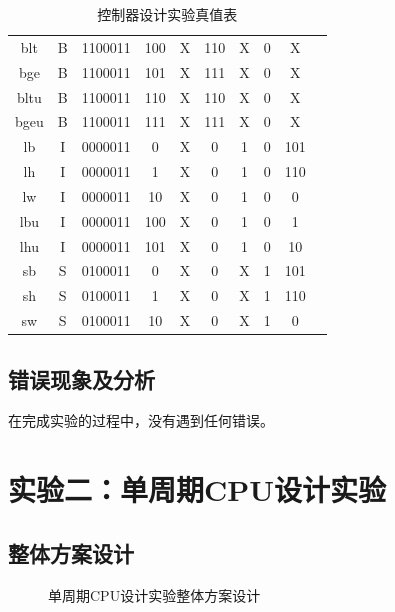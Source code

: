 \documentclass[12pt, a4paper]{ctexart}
\begin{document}
\begin{table}[H]
\begin{tabular}{cccccccccc}
        blt & B & 1100011 & 100 & X & 110 & X & 0 & X \\
        bge & B & 1100011 & 101 & X & 111 & X & 0 & X \\
        bltu & B & 1100011 & 110 & X & 110 & X & 0 & X \\
        bgeu & B & 1100011 & 111 & X & 111 & X & 0 & X \\
        lb & I & 0000011 & 0 & X & 0 & 1 & 0 & 101 \\
        lh & I & 0000011 & 1 & X & 0 & 1 & 0 & 110 \\
        lw & I & 0000011 & 10 & X & 0 & 1 & 0 & 0 \\
        lbu & I & 0000011 & 100 & X & 0 & 1 & 0 & 1 \\
        lhu & I & 0000011 & 101 & X & 0 & 1 & 0 & 10 \\
        sb & S & 0100011 & 0 & X & 0 & X & 1 & 101 \\
        sh & S & 0100011 & 1 & X & 0 & X & 1 & 110 \\
        sw & S & 0100011 & 10 & X & 0 & X & 1 & 0 \\
        \hline
    \end{tabular}
    \caption{控制器设计实验真值表}
\end{table}

\subsection{错误现象及分析}

在完成实验的过程中，没有遇到任何错误。

\section{实验二：单周期CPU设计实验}

\subsection{整体方案设计}

\begin{figure}[H]
    \centering
    \caption{单周期CPU设计实验整体方案设计}
\end{figure}
\end{document}
